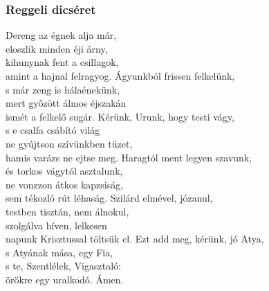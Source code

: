 \documentclass[twoside]{article}
\begin{document}

\subsubsection*{Reggeli dicséret}



\begin{hymnstanzas}
    Dereng az égnek alja már,\\
    eloszlik minden éji árny,\\
    kihunynak fent a csillagok,\\
    amint a hajnal felragyog.
\stanzabreak
    Ágyunkból frissen felkelünk,\\
    s már zeng is hálaénekünk,\\
    mert győzött álmos éjszakán\\
    ismét a felkelő sugár.
\stanzabreak
    Kérünk, Urunk, hogy testi vágy,\\
    s e csalfa csábító világ\\
    ne gyújtson szívünkben tüzet,\\
    hamis varázs ne ejtse meg.
\stanzabreak
    Haragtól ment legyen szavunk,\\
    és torkos vágytól asztalunk,\\
    ne vonzzon átkos kapzsiság,\\
    sem tékozló rút léhaság.
\stanzabreak
    Szilárd elmével, józanul,\\
    testben tisztán, nem álnokul,\\
    szolgálva híven, lelkesen\\
    napunk Krisztussal töltsük el.
\stanzabreak
    Ezt add meg, kérünk, jó Atya,\\
    s Atyának mása, egy Fia,\\
    s te, Szentlélek, Vigasztaló:\\
    örökre egy uralkodó. Ámen.
\end{hymnstanzas}



\end{document}
